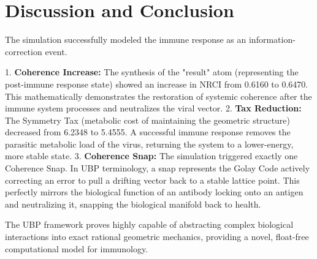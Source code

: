 \documentclass[11pt,a4paper]{article}
\begin{document}
\section{Discussion and Conclusion}
The simulation successfully modeled the immune response as an information-correction event. 

1. \textbf{Coherence Increase:} The synthesis of the "result" atom (representing the post-immune response state) showed an increase in NRCI from 0.6160 to 0.6470. This mathematically demonstrates the restoration of systemic coherence after the immune system processes and neutralizes the viral vector.
2. \textbf{Tax Reduction:} The Symmetry Tax (metabolic cost of maintaining the geometric structure) decreased from 6.2348 to 5.4555. A successful immune response removes the parasitic metabolic load of the virus, returning the system to a lower-energy, more stable state.
3. \textbf{Coherence Snap:} The simulation triggered exactly one Coherence Snap. In UBP terminology, a snap represents the Golay Code actively correcting an error to pull a drifting vector back to a stable lattice point. This perfectly mirrors the biological function of an antibody locking onto an antigen and neutralizing it, snapping the biological manifold back to health.

The UBP framework proves highly capable of abstracting complex biological interactions into exact rational geometric mechanics, providing a novel, float-free computational model for immunology.
\end{document}
